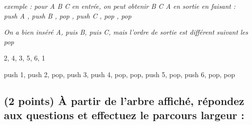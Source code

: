 \documentclass[11pt,a4paper]{article}
\begin{document}
\bigskip

\begin{center}
\noindent \textit{exemple : pour \og A B C \fg{} en entrée, on peut obtenir \og B C A \fg{} en sortie en faisant : \linebreak
\og push A \fg, \og push B \fg, \og pop \fg, \og push C \fg, \og pop \fg, \og pop \fg }

\textit{On a bien inséré A, puis B, puis C, mais l'ordre de sortie est différent suivant les \og pop \fg}
\end{center}

\medskip


\begin{center}

\begin{large}
2, 4, 3, 5, 6, 1
\end{large}

\begin{center}
 push 1, push 2, pop, push 3, push 4, pop, pop, push 5, pop, push 6, pop, pop
\end{center}

\end{center}


\clearpage

\subsection{(2 points) \`A partir de l'arbre affiché, répondez aux questions et effectuez le parcours largeur : }

\vspace*{-0.5cm}
\end{document}
